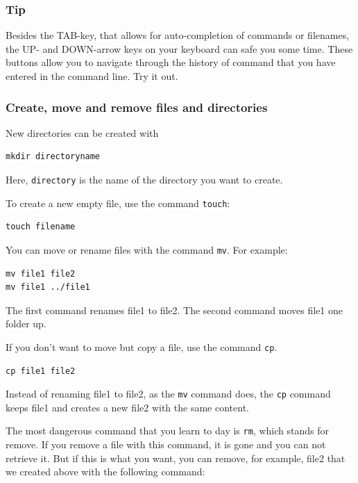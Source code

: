 \documentclass[11pt]{article}
\begin{document}
\subsubsection{Tip}
\label{sec-2-1-6}

Besides the TAB-key, that allows for auto-completion of commands or
filenames, the UP- and DOWN-arrow keys on your keyboard can safe you
some time. These buttons allow you to navigate through the history of
command that you have entered in the command line.  Try it out.
\subsubsection{Create, move and remove files and directories}
\label{sec-2-1-7}

New directories can be created with


\begin{verbatim}
mkdir directoryname
\end{verbatim}
Here, \texttt{directory} is the name of the directory you want to create.

To create a new empty file, use the command \texttt{touch}:


\begin{verbatim}
touch filename
\end{verbatim}

You can move or rename files with the command \texttt{mv}. For example:


\begin{verbatim}
mv file1 file2
mv file1 ../file1
\end{verbatim}

The first command renames file1 to file2. The second command moves
file1 one folder up.

If you don't want to move but copy a file, use the command \texttt{cp}.


\begin{verbatim}
cp file1 file2
\end{verbatim}
Instead of renaming file1 to file2, as the \texttt{mv} command does, the \texttt{cp}
command keeps file1 and creates a new file2 with the same content.

The most dangerous command that you learn to day is \texttt{rm}, which stands
for remove. If you remove a file with this command, it is gone and you
can not retrieve it. But if this is what you want, you can remove, for
example, file2 that we created above with the following command:
\end{document}
